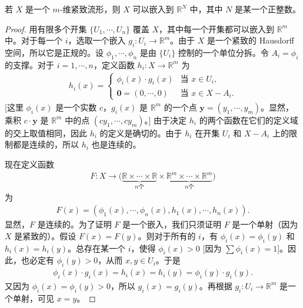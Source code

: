 \begin{theorem}\label{theorem:ch04-manifold-embedding}
若 $X$ 是一个 $m$-维紧致流形，则 $X$ 可以嵌入到 $\mathbb{R}^{N}$ 中，其中 $N$ 是某一个正整数。
\end{theorem}

\begin{proof}
用有限多个开集 $\{U_{1},\cdots,U_{n}\}$ 覆盖 $X$，其中每一个开集都可以嵌入到 $\mathbb{R}^{m}$ 中。对于每一个 $i$，选取一个嵌入 $g_{i}\colon U_{i}\to\mathbb{R}^{m}$。由于 $X$ 是一个紧致的 Hausdorff 空间，所以它是正规的。设 $\phi_{1},\cdots,\phi_{n}$ 是由 $\{U_{i}\}$ 控制的一个单位分拆。令 $A_{i}=\phi_{i}$ 的支撑。对于 $i=1,\cdots,n$，定义函数 $h_{i}\colon X\to\mathbb{R}^{m}$ 为
\begin{align*}
h_{i}(x)=\begin{cases}
\phi_{i}(x)\cdot g_{i}(x) & \text{当 }x\in U_{i},\\
\boldsymbol{0}=(0,\cdots,0) & \text{当 }x\in X-A_{i}.
\end{cases}
\end{align*}
[这里 $\phi_{i}(x)$ 是一个实数 $c$，$g_{i}(x)$ 是 $\mathbb{R}^{m}$ 的一个点 $\boldsymbol{y}=(y_{1},\cdots,y_{m})$。显然，乘积 $c\cdot\boldsymbol{y}$ 是 $\mathbb{R}^{m}$ 中的点 $(cy_{1},\cdots,cy_{m})$。] 由于决定 $h_{i}$ 的两个函数在它们的定义域的交上取值相同，因此 $h_{i}$ 的定义是确切的。由于 $h_{i}$ 在开集 $U_{i}$ 和 $X-A_{i}$ 上的限制都是连续的，所以 $h_{i}$ 也是连续的。

现在定义函数
\begin{align*}
F\colon X\longrightarrow\big(\underbrace{\mathbb{R}\times\cdots\times\mathbb{R}}_{n\text{个}}\times\underbrace{\mathbb{R}^{m}\times\cdots\times\mathbb{R}^{m}}_{n\text{个}}\big)
\end{align*}
为
\begin{align*}
F(x)=(\phi_{1}(x),\cdots,\phi_{n}(x),h_{1}(x),\cdots,h_{n}(x)).
\end{align*}
显然，$F$ 是连续的。为了证明 $F$ 是一个嵌入，我们只须证明 $F$ 是一个单射（因为 $X$ 是紧致的）。假设 $F(x)=F(y)$。则对于所有的 $i$，有 $\phi_{i}(x)=\phi_{i}(y)$ 和 $h_{i}(x)=h_{i}(y)$。总存在某一个 $i$，使得 $\phi_{i}(x)>0$ [因为 $\sum\phi_{i}(x)=1$]。因此，也必定有 $\phi_{i}(y)>0$，从而 $x,y\in U_{i}$。于是
\begin{align*}
\phi_{i}(x)\cdot g_{i}(x)=h_{i}(x)=h_{i}(y)=\phi_{i}(y)\cdot g_{i}(y).
\end{align*}
又因为 $\phi_{i}(x)=\phi_{i}(y)>0$，所以 $g_{i}(x)=g_{i}(y)$。再根据 $g_{i}\colon U_{i}\to\mathbb{R}^{m}$ 是一个单射，可见 $x=y$。
\end{proof}

